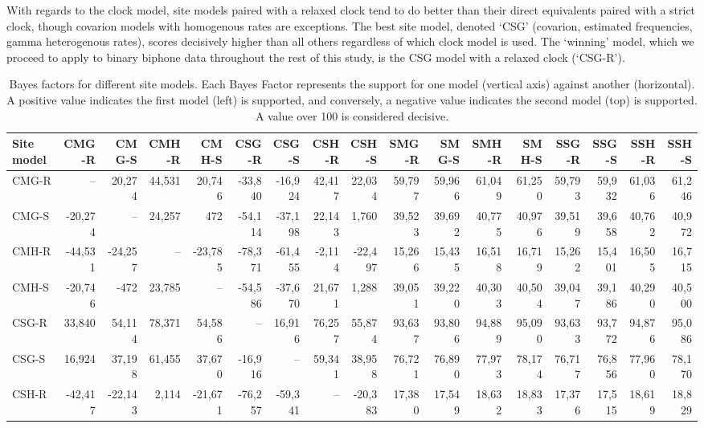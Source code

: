\documentclass[]{article}
\begin{document}
With regards to the clock model, site models paired with a relaxed clock tend to do better than their direct equivalents paired with a strict clock, though covarion models with homogenous rates are exceptions. The best site model, denoted `CSG' (covarion, estimated frequencies, gamma heterogenous rates), scores decisively higher than all others regardless of which clock model is used. The `winning' model, which we proceed to apply to binary biphone data throughout the rest of this study, is the CSG model with a relaxed clock (`CSG-R').

\begin{landscape}\begin{table}

\caption{\label{tab:site-models}Bayes factors for different site models. Each Bayes Factor represents the support for one model (vertical axis) against another (horizontal). A positive value indicates the first model (left) is supported, and conversely, a negative value indicates the second model (top) is supported. A value over 100 is considered decisive.}
\centering
\fontsize{8}{10}\selectfont
\begin{tabular}[t]{lrrrrrrrrrrrrrrrr}
\toprule
Site model & CMG-R & CMG-S & CMH-R & CMH-S & CSG-R & CSG-S & CSH-R & CSH-S & SMG-R & SMG-S & SMH-R & SMH-S & SSG-R & SSG-S & SSH-R & SSH-S\\
\midrule
CMG-R & -- & 20,274 & 44,531 & 20,746 & -33,840 & -16,924 & 42,417 & 22,034 & 59,797 & 59,966 & 61,049 & 61,250 & 59,793 & 59,932 & 61,036 & 61,246\\
CMG-S & -20,274 & -- & 24,257 & 472 & -54,114 & -37,198 & 22,143 & 1,760 & 39,523 & 39,692 & 40,775 & 40,976 & 39,519 & 39,658 & 40,762 & 40,972\\
CMH-R & -44,531 & -24,257 & -- & -23,785 & -78,371 & -61,455 & -2,114 & -22,497 & 15,266 & 15,435 & 16,518 & 16,719 & 15,262 & 15,401 & 16,505 & 16,715\\
CMH-S & -20,746 & -472 & 23,785 & -- & -54,586 & -37,670 & 21,671 & 1,288 & 39,051 & 39,220 & 40,303 & 40,504 & 39,047 & 39,186 & 40,290 & 40,500\\
\addlinespace
CSG-R & 33,840 & 54,114 & 78,371 & 54,586 & -- & 16,916 & 76,257 & 55,874 & 93,637 & 93,806 & 94,889 & 95,090 & 93,633 & 93,772 & 94,876 & 95,086\\
CSG-S & 16,924 & 37,198 & 61,455 & 37,670 & -16,916 & -- & 59,341 & 38,958 & 76,721 & 76,890 & 77,973 & 78,174 & 76,717 & 76,856 & 77,960 & 78,170\\
CSH-R & -42,417 & -22,143 & 2,114 & -21,671 & -76,257 & -59,341 & -- & -20,383 & 17,380 & 17,549 & 18,632 & 18,833 & 17,376 & 17,515 & 18,619 & 18,829\\

\end{tabular}
\end{table}
\end{landscape}
\end{document}
